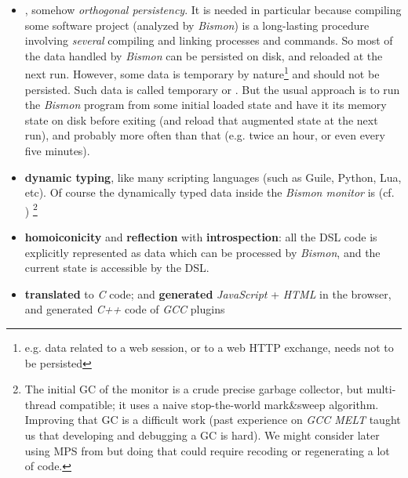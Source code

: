 \begin{itemize}

  \item {}, somehow
    \textit{orthogonal persistency}. It is needed in particular
    because compiling some software project (analyzed by
    \textit{Bismon}) is a long-lasting procedure involving
    \textit{several} compiling and linking processes and commands. So
    most of the data handled by \textit{Bismon} can be persisted on
    disk, and reloaded at the next run. However, some data is
    temporary by nature\footnote{e.g. data related to a web session,
      or to a web HTTP exchange, needs not to be persisted} and should
    not be persisted. Such data is called temporary or
    . But the usual approach is
    to run the \textit{Bismon} program from some initial loaded state
    and have it  its memory state on disk
    before exiting (and reload that augmented state at the next run),
    and probably more often than that (e.g. twice an hour, or even
    every five minutes).

  \item \textbf{dynamic typing}, like many scripting languages (such
    as Guile, Python, Lua, etc). Of course the dynamically typed data
    inside the \textit{Bismon monitor} is 
    (cf. \cite{Jones:2011:GC-handbook})
    \footnote{The initial GC of
      the monitor is a crude precise garbage collector, but
      multi-thread compatible; it uses a naive stop-the-world
      mark\&sweep algorithm. Improving that GC is a difficult work
      (past experience on \emph{GCC MELT} taught us that developing
      and debugging a GC is hard). We might consider later using MPS
      from  but doing
      that could require recoding or regenerating a lot of code.}

  \item \textbf{homoiconicity} and \textbf{reflection} with
    \textbf{introspection}: all the DSL code is explicitly represented
    as data which can be processed by \textit{Bismon}, and the current
    state is accessible by the DSL.

    \item \textbf{translated} to \emph{C} code; and \textbf{generated}
      \emph{JavaScript} + \emph{HTML} in the browser, and generated
      \emph{C++} code of \emph{GCC} plugins


\end{itemize}
